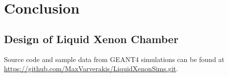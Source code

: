 \documentclass[%
reprint,
nofootinbib,
amsmath, amssymb,
aps,
floatfix,
]{revtex4-2}
\begin{document}
\section{Conclusion}
\subsection{Design of Liquid Xenon Chamber}


Source code and sample data from GEANT4 simulations can be found at 
\url{https://github.com/MaxVarverakis/LiquidXenonSims.git}.













\end{document}
